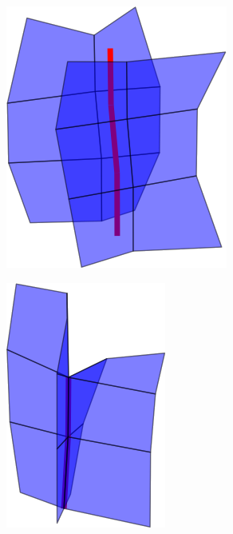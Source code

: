 \begin{figure}[p]
\begin{center}
\begin{subfigure}[b]{.45\textwidth}
\includegraphics[height = .17\textheight, width = .5\textwidth,keepaspectratio]{Pictures/SurfaceReconstruction/3DManifoldMMRes}
\end{subfigure}
\begin{subfigure}[b]{.45\textwidth}
\centering
\includegraphics[height = .17\textheight, width = .5\textwidth,keepaspectratio]{Pictures/SurfaceReconstruction/3DManifoldMI}
\end{subfigure}
\begin{subfigure}[b]{.45\textwidth}
\centering

\end{subfigure}
\end{center}
\end{figure}
